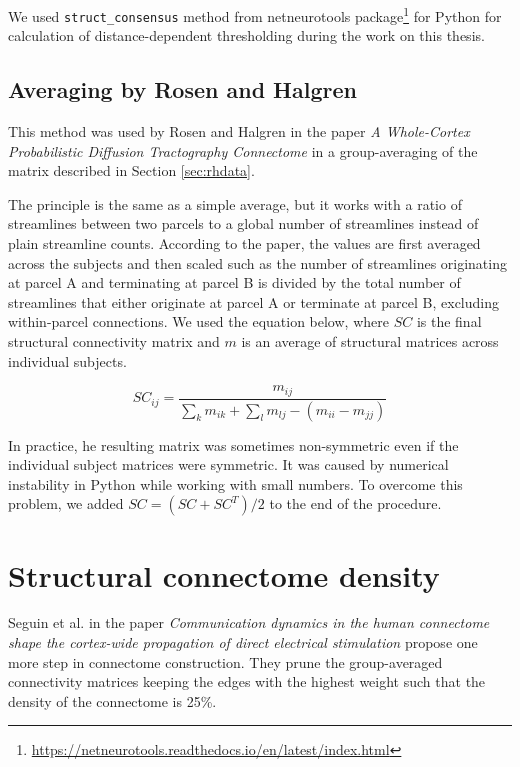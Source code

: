 We used \texttt{struct\_consensus} method from netneurotools package\footnote{\url{https://netneurotools.readthedocs.io/en/latest/index.html}} for Python for calculation of distance-dependent thresholding during the work on this thesis.

\subsection{Averaging by Rosen and Halgren}\label{sec:rh}

This method was used by Rosen and Halgren in the paper \textit{A Whole-Cortex Probabilistic Diffusion Tractography Connectome} \cite{rosen_whole-cortex_2021} in a group-averaging of the matrix described in Section \ref{sec:rhdata}.

The principle is the same as a simple average, but it works with a ratio of streamlines between two parcels to a global number of streamlines instead of plain streamline counts. According to the paper, the values are first averaged across the subjects and then scaled such as the number of streamlines originating at parcel A and terminating at parcel B is divided by the total number of streamlines that either originate at parcel A or terminate at parcel B, excluding within-parcel connections. \cite{rosen_whole-cortex_2021} We used the equation below, where $SC$ is the final structural connectivity matrix and $m$ is an average of structural matrices across individual subjects.

$$
SC_{ij} = \frac{m_{ij}}{\sum_k m_{ik} + \sum_l m_{lj} - (m_{ii} - m_{jj})}
$$

In practice, he resulting matrix was sometimes non-symmetric even if the individual subject matrices were symmetric. It was caused by numerical instability in Python while working with small numbers. To overcome this problem, we added $SC = (SC + SC^T) /2$ to the end of the procedure.

\section{Structural connectome density}

Seguin et al. \cite{seguin_communication_2023} in the paper \textit{Communication dynamics in the human connectome shape the cortex-wide propagation of direct electrical stimulation} propose one more step in connectome construction. They prune the group-averaged connectivity matrices keeping the edges with the highest weight such that the density of the connectome is 25\%. 

